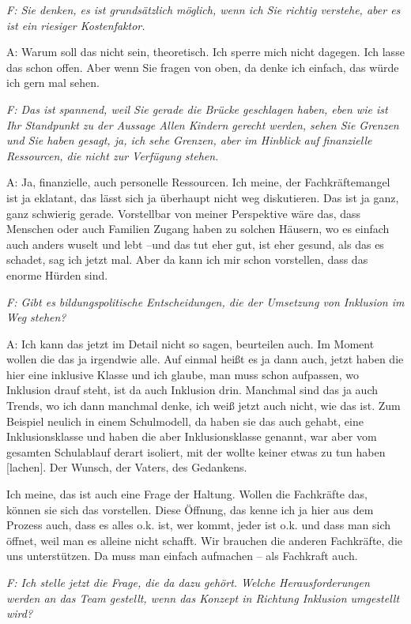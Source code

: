\begin{linenumbers*}
\emph{F: Sie denken, es ist grundsätzlich möglich, wenn ich Sie richtig verstehe, aber es ist ein riesiger Kostenfaktor.}

A: Warum soll das nicht sein, theoretisch. Ich sperre mich nicht dagegen. Ich lasse das schon offen. Aber wenn Sie fragen von oben, da denke ich einfach, das würde ich gern mal sehen.
 
\emph{F: Das ist spannend, weil Sie gerade die Brücke geschlagen haben, eben wie ist Ihr Standpunkt zu der Aussage Allen Kindern gerecht werden, sehen Sie Grenzen und Sie haben gesagt, ja, ich sehe Grenzen, aber im Hinblick auf finanzielle Ressourcen, die nicht zur Verfügung stehen.} 

A: Ja, finanzielle, auch personelle Ressourcen. Ich meine, der Fachkräftemangel ist ja eklatant, das lässt sich ja überhaupt nicht weg diskutieren. Das ist ja ganz, ganz schwierig gerade. Vorstellbar von meiner Perspektive wäre das, dass Menschen oder auch Familien Zugang haben zu solchen Häusern, wo es einfach auch anders wuselt und lebt  --und das tut eher gut, ist eher gesund, als das es schadet, sag ich jetzt mal. Aber da kann ich mir schon vorstellen, dass das enorme Hürden sind. 

\emph{F: Gibt es bildungspolitische Entscheidungen, die der Umsetzung von Inklusion im Weg stehen?} 

A: Ich kann das jetzt im Detail nicht so sagen, beurteilen auch. Im Moment wollen die das ja irgendwie alle. Auf einmal heißt es ja dann auch, jetzt haben die hier eine inklusive Klasse und ich glaube, man muss schon aufpassen, wo Inklusion drauf steht, ist da auch Inklusion drin. Manchmal sind das ja auch Trends, wo ich dann manchmal denke, ich weiß jetzt auch nicht, wie das ist. Zum Beispiel neulich in einem Schulmodell, da haben sie das auch gehabt, eine Inklusionsklasse und haben die aber Inklusionsklasse genannt, war aber vom gesamten Schulablauf derart isoliert, mit der wollte keiner etwas zu tun haben [lachen]. Der Wunsch, der Vaters, des Gedankens. 

Ich meine, das ist auch eine Frage der Haltung. Wollen die Fachkräfte das, können sie sich das vorstellen. Diese Öffnung, das kenne ich ja hier aus dem Prozess auch, dass es alles o.k. ist, wer kommt, jeder ist o.k. und dass man sich öffnet, weil man es alleine nicht schafft. Wir brauchen die anderen Fachkräfte, die uns unterstützen. Da muss man einfach aufmachen -- als Fachkraft auch.

\emph{F: Ich stelle jetzt die Frage, die da dazu gehört. Welche Herausforderungen werden an das Team gestellt, wenn das Konzept in Richtung Inklusion umgestellt wird?}


\end{linenumbers*}
